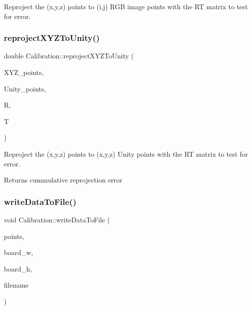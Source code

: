 Reproject the (x,y,z) points to (i,j) R\+GB image points with the RT matrix to test for error. 

\hypertarget{class_calibration_ac69c3f4ad6231d799e7b3d644acf1dcf}{}\label{class_calibration_ac69c3f4ad6231d799e7b3d644acf1dcf} 
\subsubsection{\texorpdfstring{reproject\+X\+Y\+Z\+To\+Unity()}{reprojectXYZToUnity()}}
{\footnotesize\ttfamily double Calibration\+::reproject\+X\+Y\+Z\+To\+Unity (\begin{DoxyParamCaption}\item[{std\+::vector$<$ std\+::vector$<$ cv\+::\+Point3f $>$$>$}]{X\+Y\+Z\+\_\+points,  }\item[{std\+::vector$<$ std\+::vector$<$ cv\+::\+Point3f $>$$>$}]{Unity\+\_\+points,  }\item[{Eigen\+::\+Matrix\+Xf}]{R,  }\item[{Eigen\+::\+Matrix\+Xf}]{T }\end{DoxyParamCaption})\hspace{0.3cm}{\ttfamily [static]}}



Reproject the (x,y,z) points to (x\textquotesingle{},y\textquotesingle{},z\textquotesingle{}) Unity points with the RT matrix to test for error. 

\begin{DoxyReturn}{Returns}
cummulative reprojection error 
\end{DoxyReturn}
\hypertarget{class_calibration_acd3adc799a4a9ce12ce1547e989e20a4}{}\label{class_calibration_acd3adc799a4a9ce12ce1547e989e20a4} 
\subsubsection{\texorpdfstring{write\+Data\+To\+File()}{writeDataToFile()}}
{\footnotesize\ttfamily void Calibration\+::write\+Data\+To\+File (\begin{DoxyParamCaption}\item[{std\+::vector$<$ std\+::vector$<$ cv\+::\+Point3f $>$$>$}]{points,  }\item[{int}]{board\+\_\+w,  }\item[{int}]{board\+\_\+h,  }\item[{std\+::string}]{filename }\end{DoxyParamCaption})\hspace{0.3cm}{\ttfamily [static]}}



